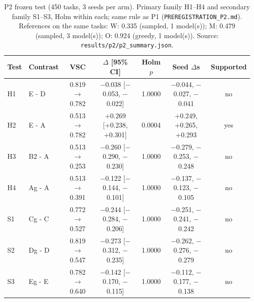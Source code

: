 \begin{table}[t]\centering\small
\begin{tabular}{llccccc}\toprule
Test & Contrast & VSC & $\Delta$ [95\% CI] & Holm $p$ & Seed $\Delta$s & Supported \\\midrule
H1 & E - D & 0.819 $\to$ 0.782 & $-$0.038 [$-$0.053, $-$0.022] & 1.0000 & $-$0.044, $-$0.027, $-$0.041 & no \\
H2 & E - A & 0.513 $\to$ 0.782 & +0.269 [+0.238, +0.301] & 0.0004 & +0.249, +0.265, +0.293 & yes \\
H3 & B2 - A & 0.513 $\to$ 0.253 & $-$0.260 [$-$0.290, $-$0.230] & 1.0000 & $-$0.279, $-$0.253, $-$0.248 & no \\
H4 & Ag - A & 0.513 $\to$ 0.391 & $-$0.122 [$-$0.144, $-$0.101] & 1.0000 & $-$0.137, $-$0.123, $-$0.105 & no \\
\midrule
S1 & Cg - C & 0.772 $\to$ 0.527 & $-$0.244 [$-$0.284, $-$0.206] & 1.0000 & $-$0.251, $-$0.241, $-$0.242 & no \\
S2 & Dg - D & 0.819 $\to$ 0.547 & $-$0.273 [$-$0.312, $-$0.235] & 1.0000 & $-$0.262, $-$0.276, $-$0.279 & no \\
S3 & Eg - E & 0.782 $\to$ 0.640 & $-$0.142 [$-$0.170, $-$0.115] & 1.0000 & $-$0.112, $-$0.177, $-$0.138 & no \\
\bottomrule\end{tabular}
\caption{P2 frozen test (450 tasks, 3 seeds per arm). Primary family H1--H4 and secondary family S1--S3, Holm within each; same rule as P1 (\texttt{PREREGISTRATION\_P2.md}). References on the same tasks: W: 0.335 (sampled, 1 model(s)); M: 0.479 (sampled, 3 model(s)); O: 0.924 (greedy, 1 model(s)). Source: \texttt{results/p2/p2\_summary.json}.}
\label{tab:p2}\end{table}
